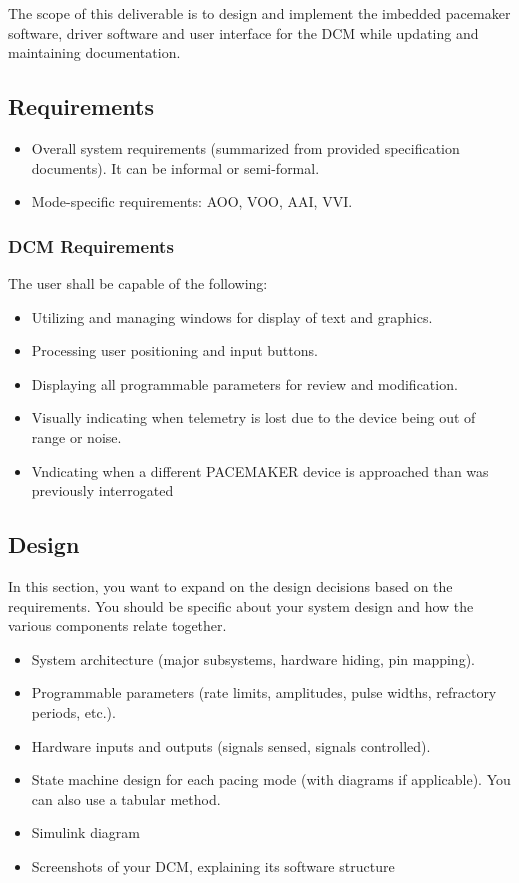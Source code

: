 \documentclass{article}
\begin{document}
The scope of this deliverable is to design and implement the imbedded pacemaker software, driver software and user interface for 
the DCM while updating and maintaining documentation. 



\subsection{Requirements}

\begin{itemize}
    \item Overall system requirements (summarized from provided specification documents). It can be informal or semi-formal.
    \item Mode-specific requirements: AOO, VOO, AAI, VVI.
\end{itemize}

\subsubsection{DCM Requirements}
The user shall be capable of the following:
\begin{itemize}
    \item Utilizing and managing windows for display of text and graphics.
    \item Processing user positioning and input buttons.
    \item Displaying all programmable parameters for review and modification.
    \item Visually indicating when telemetry is lost due to the device being out of range or noise.
    \item Vndicating when a different PACEMAKER device is approached than was previously interrogated
\end{itemize}

\subsection{Design}

In this section, you want to expand on the design decisions based on the requirements. You should be specific about your system design and how the various components relate together.

\begin{itemize}
    \item System architecture (major subsystems, hardware hiding, pin mapping).
    \item Programmable parameters (rate limits, amplitudes, pulse widths, refractory periods, etc.).
    \item Hardware inputs and outputs (signals sensed, signals controlled).
    \item State machine design for each pacing mode (with diagrams if applicable). You can also use a tabular method.
    \item Simulink diagram
    \item Screenshots of your DCM, explaining its software structure
\end{itemize}
\end{document}
